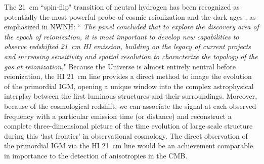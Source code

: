 \documentclass[preprint]{aastex}
\def\HI{{H{\small I }}}
\begin{document}
The 21~cm ``spin-flip" transition of  neutral hydrogen has been recognized as potentially the most powerful probe 
of cosmic reionization and  the dark ages \citep{morales_wyithe2010, furlanetto_et_al2006}, as emphasized in NWNH: 
``{\it 
The panel concluded that  to explore the discovery area of the epoch of reionization, it is most important to 
develop new capabilities to observe redshifted 21~cm \HI emission, building on the legacy of current projects and 
increasing sensitivity and spatial resolution to characterize the topology of the gas at reionization.}"  Because 
the Universe is almost entirely neutral before reionization, the HI 21~cm line provides a direct method to image 
the evolution of the primordial IGM, opening a unique window into the complex astrophysical interplay between the 
first luminous structures and their surroundings. Moreover, because of the cosmological redshift, we can associate 
the signal at each observed frequency with a particular emission time (or distance) and reconstruct a complete 
three-dimensional picture of the time evolution of large scale structure during this `last frontier' in 
observational cosmology. 
The direct observation of the primordial IGM via the HI 21~cm line would be an achievement comparable in importance 
to the detection of anisotropies in the CMB.

\end{document}
